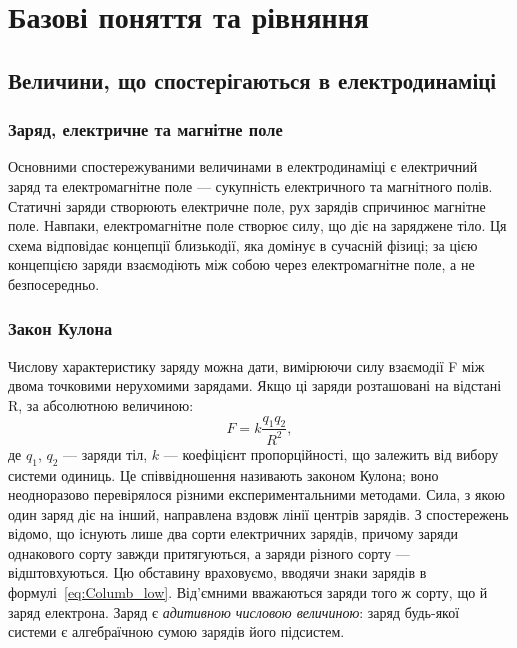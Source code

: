 
\chapter{Базові поняття та рівняння}\label{\currfilebase}

\section{Величини, що спостерігаються в електродинаміці}

\subsection*{Заряд, електричне та магнітне поле}


Основними спостережуваними величинами в електродинаміці є
електричний заряд та електромагнітне поле --- сукупність електричного та
магнітного полів. Статичні заряди створюють електричне поле, рух зарядів
спричинює магнітне поле. Навпаки, електромагнітне поле створює силу, що діє
на заряджене тіло. Ця схема відповідає концепції близькодії, яка домінує в
сучасній фізиці; за цією концепцією заряди взаємодіють між собою через
електромагнітне поле, а не безпосередньо.

\subsection*{Закон Кулона}

Числову характеристику заряду можна дати, вимірюючи
силу взаємодії F між двома точковими нерухомими зарядами. Якщо ці заряди
розташовані на відстані R, за абсолютною величиною:
\begin{equation}\label{eq:Columb_low}
	F = k \frac{q_1q_2}{R^2},
\end{equation}
де $q_1$, $q_2$ --- заряди тіл, $k$ --- коефіцієнт пропорційності, що залежить від вибору
системи одиниць. Це співвідношення називають законом Кулона; воно
неодноразово перевірялося різними експериментальними методами. Сила, з
якою один заряд діє на інший, направлена вздовж лінії центрів зарядів.
З спостережень відомо, що існують лише два сорти електричних зарядів,
причому заряди однакового сорту завжди притягуються, а заряди різного сорту
— відштовхуються. Цю обставину враховуємо, вводячи знаки зарядів в
формулі~\eqref{eq:Columb_low}. Від'ємними вважаються заряди того ж сорту, що й заряд
електрона. Заряд є \emph{адитивною числовою величиною}: заряд будь-якої
системи є алгебраїчною сумою зарядів його підсистем.

